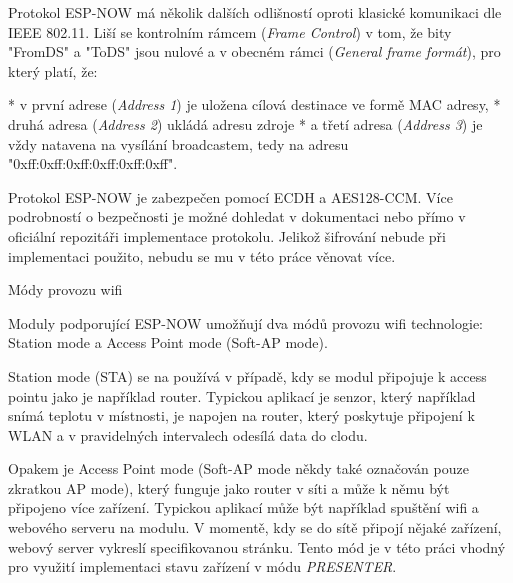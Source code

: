 Protokol ESP-NOW má několik dalších odlišností oproti klasické komunikaci dle IEEE 802.11. Liší se kontrolním rámcem ({\em Frame Control}) v tom, že bity "FromDS" a "ToDS" jsou nulové a v obecném rámci ({\em General frame formát}), pro který platí, že:

\begitems
* v první adrese ({\em Address 1}) je uložena cílová destinace ve formě MAC adresy,
* druhá adresa ({\em Address 2}) ukládá adresu zdroje
* a třetí adresa ({\em Address 3}) je vždy natavena na vysílání broadcastem, tedy na adresu "0xff:0xff:0xff:0xff:0xff:0xff".
\enditems

Protokol ESP-NOW je zabezpečen pomocí ECDH a AES128-CCM. Více podrobností o bezpečnosti je možné dohledat v dokumentaci  nebo přímo v oficiální repozitáři implementace protokolu. Jelikož šifrování nebude při implementaci použito, nebudu se mu v této práce věnovat více.

\secc Módy provozu wifi

Moduly podporující ESP-NOW umožňují dva módů provozu wifi technologie: Station mode a Access Point mode (Soft-AP mode).

{\sbf Station mode} (STA) se na používá v případě, kdy se modul připojuje k access pointu jako je například router. Typickou aplikací je senzor, který například snímá teplotu v místnosti, je napojen na router, který poskytuje připojení k WLAN a v pravidelných intervalech odesílá data do clodu.

Opakem je {\sbf Access Point mode} (Soft-AP mode někdy také označován pouze zkratkou AP mode), který funguje jako router v síti a může k němu být připojeno více zařízení. Typickou aplikací může být například spuštění wifi a webového serveru na modulu. V momentě, kdy se do sítě připojí nějaké zařízení, webový server vykreslí specifikovanou stránku.
Tento mód je v této práci vhodný pro využití implementaci stavu zařízení v módu {\em PRESENTER}.

